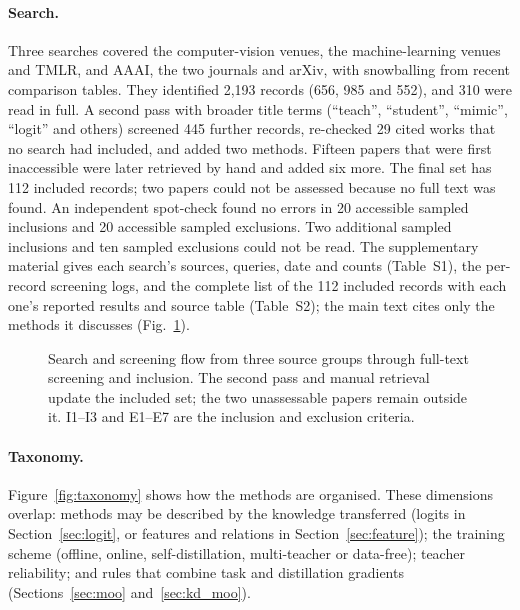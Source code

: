 \paragraph{Search.} Three searches covered the computer-vision venues, the machine-learning venues and
TMLR, and AAAI, the two journals and arXiv, with snowballing from recent comparison tables. They identified 2,193 records (656, 985 and 552), and 310 were read in full. A
second pass with broader title terms (``teach'', ``student'', ``mimic'', ``logit'' and others) screened 445
further records, re-checked 29 cited works that no search had included, and added two methods. Fifteen
papers that were first inaccessible were later retrieved by hand and added six more. The final set has
112 included records; two papers could not be assessed because no full text was found. An independent spot-check found no errors in 20 accessible sampled inclusions and 20 accessible sampled exclusions. Two additional sampled inclusions and ten sampled exclusions could not be read. The supplementary material gives
each search's sources, queries, date and counts (Table~S1), the per-record screening logs, and the complete list
of the 112 included records with each one's reported results and source table (Table~S2); the main text cites
only the methods it discusses (Fig.~\ref{fig:search-flow}).

\begin{figure}[t]
\centering
\resizebox{\linewidth}{!}{}
\caption{Search and screening flow from three source groups through full-text screening and inclusion. The second pass and manual retrieval update the included set; the two unassessable papers remain outside it. I1--I3 and E1--E7 are the inclusion and exclusion criteria.}
\label{fig:search-flow}
\end{figure}

\paragraph{Taxonomy.} Figure~\ref{fig:taxonomy} shows how the methods are organised. These dimensions overlap: methods may be described by the knowledge transferred (logits in Section~\ref{sec:logit}, or features and relations in Section~\ref{sec:feature}); the training scheme (offline, online, self-distillation, multi-teacher or data-free); teacher reliability; and rules that combine task and distillation gradients (Sections~\ref{sec:moo} and~\ref{sec:kd_moo}).

